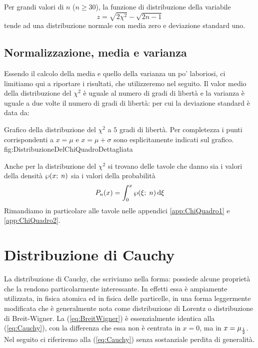 \noindent Per grandi valori di $n$ ($n\ge 30$), la funzione di distribuzione
della variabile
$$
z = \sqrt{2\chi^2}-\sqrt{2n-1}
$$
tende ad una distribuzione normale con media zero e deviazione standard uno.

\subsection{Normalizzazione, media e varianza}

Essendo il calcolo della media e quello della varianza un po'
laboriosi, ci limitiamo qui a riportare i risultati, che utilizzeremo
nel seguito.
Il valor medio  della
distribuzione del $\chi^2$ \`e uguale al numero di
gradi di libert\`a
e la varianza  \`e
uguale a due volte il numero di gradi di libert\`a:
per cui la deviazione standard \`e data da:

\panelfig
{}
{Grafico della distribuzione del $\chi^2$ a $5$ gradi di libert\`a.
Per completezza i punti corrispondenti a $x = \mu$ e $x = \mu + \sigma$
sono esplicitamente indicati sul grafico.}
{fig:DistribuzioneDelChiQuadroDettagliata}

Anche per la distribuzione del $\chi^2$ si trovano delle tavole che danno
sia i valori della densit\`a $\chisquarepdf{x}{n}$
sia i valori della probabilit\`a
$$
P_n(x)=\dintegral{\chisquarepdf{\xi}{n}}{\xi}{0}{x}
$$
Rimandiamo in particolare alle tavole nelle appendici \ref{app:ChiQuadro1}
e \ref{app:ChiQuadro2}.


\section{Distribuzione di Cauchy}

La distribuzione di Cauchy, che scriviamo nella
forma:
possiede alcune propriet\`a che la rendono particolarmente interessante.
In effetti essa \`e ampiamente utilizzata,
in fisica atomica ed in fisica delle particelle, in una forma
leggermente modificata
che \`e generalmente nota come distribuzione di Lorentz o distribuzione
di Breit-Wigner. La (\ref{eq:BreitWigner}) \`e essenzialmente identica
alla (\ref{eq:Cauchy}), con la differenza che essa non \`e centrata in
$x = 0$, ma in $x = \median$.
Nel seguito ci riferiremo alla (\ref{eq:Cauchy}) senza sostanziale
perdita di generalit\`a.

